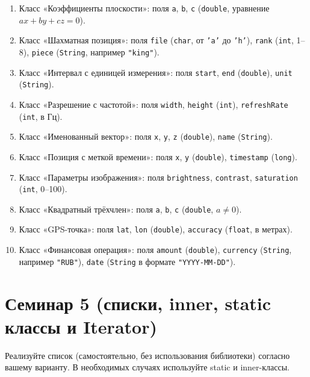 \documentclass[12pt]{article}
\begin{document}
\begin{enumerate}
    \item Класс «Коэффициенты плоскости»: поля \texttt{a}, \texttt{b}, \texttt{c} (\texttt{double}, уравнение $ax + by + cz = 0$).
    \item Класс «Шахматная позиция»: поля \texttt{file} (\texttt{char}, от \texttt{'a'} до \texttt{'h'}), \texttt{rank} (\texttt{int}, 1–8), \texttt{piece} (\texttt{String}, например \texttt{"king"}).
    \item Класс «Интервал с единицей измерения»: поля \texttt{start}, \texttt{end} (\texttt{double}), \texttt{unit} (\texttt{String}).
    \item Класс «Разрешение с частотой»: поля \texttt{width}, \texttt{height} (\texttt{int}), \texttt{refreshRate} (\texttt{int}, в Гц).
    \item Класс «Именованный вектор»: поля \texttt{x}, \texttt{y}, \texttt{z} (\texttt{double}), \texttt{name} (\texttt{String}).
    \item Класс «Позиция с меткой времени»: поля \texttt{x}, \texttt{y} (\texttt{double}), \texttt{timestamp} (\texttt{long}).
    \item Класс «Параметры изображения»: поля \texttt{brightness}, \texttt{contrast}, \texttt{saturation} (\texttt{int}, 0–100).
    \item Класс «Квадратный трёхчлен»: поля \texttt{a}, \texttt{b}, \texttt{c} (\texttt{double}, $a \neq 0$).
    \item Класс «GPS-точка»: поля \texttt{lat}, \texttt{lon} (\texttt{double}), \texttt{accuracy} (\texttt{float}, в метрах).
    \item Класс «Финансовая операция»: поля \texttt{amount} (\texttt{double}), \texttt{currency} (\texttt{String}, например \texttt{"RUB"}), \texttt{date} (\texttt{String} в формате \texttt{"YYYY-MM-DD"}).
\end{enumerate}

\section{Семинар 5 (списки, inner, static классы и Iterator)}

Реализуйте список (самостоятельно, без использования библиотеки) согласно
вашему варианту. В необходимых случаях используйте static и inner-классы. 
\end{document}
